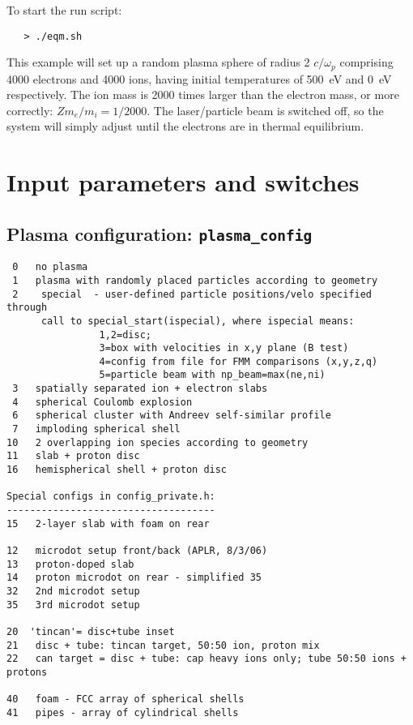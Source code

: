 \documentclass[11pt,psfig]{article}
\begin{document}
\normalsize

\noindent
To start the run script:
\begin{verbatim}
   > ./eqm.sh
\end{verbatim}

\noindent
This example will set up a random plasma sphere of radius 2 $c/\omega_p$ comprising 4000 electrons and
4000 ions, having initial temperatures of 500~eV and 0~eV respectively. The
ion mass is 2000 times larger than the electron mass, or more correctly:
$Zm_e/m_i = 1/2000$.  The laser/particle beam is switched off, so the system
will simply adjust until the electrons are in thermal equilibrium.

\section{Input parameters and switches \label{inputs}}

\subsection{Plasma configuration:  {\tt plasma\_config}}
\begin{verbatim}
 0   no plasma
 1   plasma with randomly placed particles according to geometry
 2    special  - user-defined particle positions/velo specified through 
      call to special_start(ispecial), where ispecial means:
                1,2=disc;
                3=box with velocities in x,y plane (B test)
                4=config from file for FMM comparisons (x,y,z,q)
                5=particle beam with np_beam=max(ne,ni)
 3   spatially separated ion + electron slabs
 4   spherical Coulomb explosion
 6   spherical cluster with Andreev self-similar profile
 7   imploding spherical shell
10   2 overlapping ion species according to geometry
11   slab + proton disc
16   hemispherical shell + proton disc

Special configs in config_private.h:
------------------------------------
15   2-layer slab with foam on rear

12   microdot setup front/back (APLR, 8/3/06)
13   proton-doped slab
14   proton microdot on rear - simplified 35
32   2nd microdot setup
35   3rd microdot setup

20  'tincan'= disc+tube inset
21   disc + tube: tincan target, 50:50 ion, proton mix
22   can target = disc + tube: cap heavy ions only; tube 50:50 ions + protons

40   foam - FCC array of spherical shells
41   pipes - array of cylindrical shells
\end{verbatim}
\end{document}
